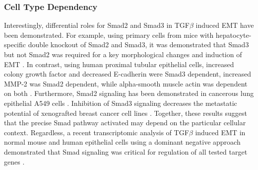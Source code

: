 \subsubsection*{Cell Type Dependency} Interestingly, differential roles for Smad2 and Smad3 in TGF$\beta$ induced EMT have been demonstrated.
For example, using primary cells from mice with hepatocyte-specific double knockout of Smad2 and Smad3, it was demonstrated that Smad3 but not Smad2 was required for a key morphological changes and induction of EMT \cite{Ju:2006so}.
In contrast, using human proximal tubular epithelial cells, increased colony growth factor and decreased E-cadherin were Smad3 dependent, increased MMP-2 was Smad2 dependent, while alpha-smooth muscle actin was dependent on both \cite{Phanish2006}.
Furthermore, Smad2 signaling has been demonstrated in cancerous lung epithelial A549 cells \cite{Kasai2005}.
Inhibition of Smad3 signaling decreases the metastatic potential of xenografted breast cancer cell lines \cite{Tian2003,Tian2004}.
Together, these results suggest that the precise Smad pathway activated may depend on the particular cellular context.
Regardless, a recent transcriptomic analysis of TGF$\beta$ induced EMT in normal mouse and human epithelial cells using a dominant negative approach demonstrated that Smad signaling was critical for regulation of all tested target genes \cite{Valcourt2005}.

